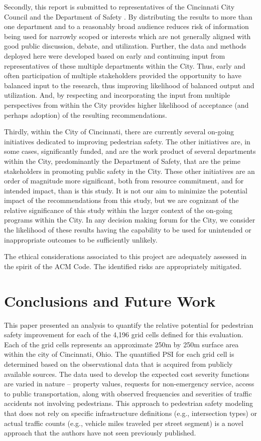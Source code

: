 \documentclass{llncs}
\begin{document}
Secondly, this report is submitted to representatives of the Cincinnati City Council and the Department of Safety . By distributing the results to more than one department and to a reasonably broad audience reduces risk of information being used for narrowly scoped  or interests which are not generally aligned with good public discussion, debate, and utilization. Further, the data and methods deployed here were developed based on early and continuing input from representatives of these multiple departments within the City. Thus, early and often participation of multiple stakeholders provided the opportunity to have balanced input to the research, thus improving likelihood of balanced output and utilization. And, by respecting and incorporating the input from multiple perspectives from within the City provides higher likelihood of acceptance (and perhaps adoption) of the resulting recommendations.

Thirdly, within the City of Cincinnati, there are currently several on-going initiatives dedicated to improving pedestrian safety. The other initiatives are, in some cases, significantly funded, and are the work product of several departments within the City, predominantly the Department of Safety, that are the prime stakeholders in promoting public safety in the City. These other initiatives are an order of magnitude more significant, both from resource commitment, and for intended impact, than is this study. It is not our aim to minimize the potential impact of the recommendations from this study, but we are cognizant of the relative significance of this study within the larger context of the on-going programs within the City. In any decision making forum for the City, we consider the likelihood of these results having the capability to be used for unintended or inappropriate outcomes to be sufficiently unlikely.

The ethical considerations associated to this project are adequately assessed in the spirit of the ACM Code. The identified risks are appropriately mitigated.
%
\section{Conclusions and Future Work}
%

This paper presented an analysis to quantify the relative potential for pedestrian safety improvement for each of the 4,196 grid cells defined for this evaluation. Each of the grid cells represents an approximate 250m by 250m surface area within the city of Cincinnati, Ohio. The quantified PSI for each grid cell is determined based on the observational data that is acquired from publicly available sources. The data used to develop the expected cost severity functions are varied in nature – property values, requests for non-emergency service, access to public transportation, along with observed frequencies and severities of traffic accidents not involving pedestrians. This approach to pedestrian safety modeling that does not rely on specific infrastructure definitions (e.g., intersection types) or actual traffic counts (e.g., vehicle miles traveled per street segment) is a novel approach that the authors have not seen previously published.
\end{document}
